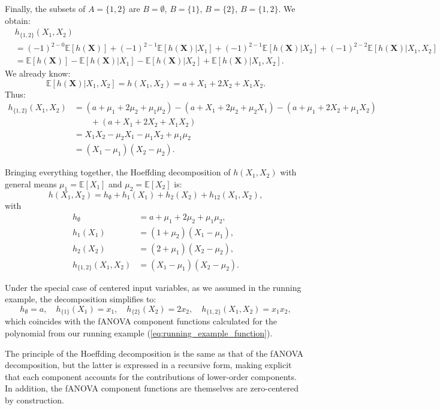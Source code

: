 Finally, the subsets of $A=\{1,2\}$ are 
$B=\emptyset$, $B=\{1\}$, $B=\{2\}$, $B=\{1,2\}$. 
We obtain:
\[
\begin{aligned}
&h_{\{1,2\}}(X_1,X_2) \\
&=
(-1)^{2-0}\mathbb{E}[h(\boldsymbol{X})]
+(-1)^{2-1}\mathbb{E}[h(\boldsymbol{X})|X_1]
+(-1)^{2-1}\mathbb{E}[h(\boldsymbol{X})|X_2]
+(-1)^{2-2}\mathbb{E}[h(\boldsymbol{X})|X_1,X_2]
\\
&=
\mathbb{E}[h(\boldsymbol{X})]
-\mathbb{E}[h(\boldsymbol{X})|X_1]
-\mathbb{E}[h(\boldsymbol{X})|X_2]
+\mathbb{E}[h(\boldsymbol{X})|X_1,X_2].
\end{aligned}
\]
We already know:
\[
\mathbb{E}[h(\boldsymbol{X})|X_1,X_2] = h(X_1,X_2) = a + X_1 + 2X_2 + X_1 X_2.
\]
Thus:
\[
\begin{aligned}
h_{\{1,2\}}(X_1,X_2)
&=(a+\mu_1+2\mu_2+\mu_1\mu_2)
 - (a+X_1+2\mu_2+\mu_2 X_1)
 - (a+\mu_1+2X_2+\mu_1 X_2) \\
&\qquad + (a+X_1+2X_2+X_1 X_2) \\
&= X_1 X_2 - \mu_2 X_1 - \mu_1 X_2 + \mu_1 \mu_2 \\
&= (X_1 - \mu_1)(X_2 - \mu_2).
\end{aligned}
\]

Bringing everything together, the Hoeffding decomposition of $h(X_1,X_2)$ with general means 
$\mu_1=\mathbb{E}[X_1]$ and $\mu_2=\mathbb{E}[X_2]$ is:
\[
h(X_1,X_2)
=
h_{\emptyset} + h_1(X_1) + h_2(X_2) + h_{12}(X_1,X_2),
\]
with
\[
\begin{aligned}
h_{\emptyset} &= a + \mu_1 + 2\mu_2 + \mu_1\mu_2, \\[0.3em]
h_1(X_1) &= (1+\mu_2)(X_1 - \mu_1), \\[0.3em]
h_2(X_2) &= (2+\mu_1)(X_2 - \mu_2), \\[0.3em]
h_{\{1,2\}}(X_1,X_2) &= (X_1 - \mu_1)(X_2 - \mu_2).
\end{aligned}
\]

Under the special case of centered input variables, as we assumed in the running example, the decomposition simplifies to:
\[
h_{\emptyset}=a,\quad
h_{\{1\}}(X_1)=x_1,\quad
h_{\{2\}}(X_2)=2x_2,\quad
h_{\{1,2\}}(X_1,X_2)=x_1 x_2,
\]
which coincides with the fANOVA component functions calculated for the polynomial from our running example (\autoref{eq:running_example_function}).\par
The principle of the Hoeffding decomposition is the same as that of the fANOVA decomposition, but the latter is expressed in a recursive form, making explicit that each component accounts for the contributions of lower-order components.
In addition, the fANOVA component functions are themselves are zero-centered by construction.



